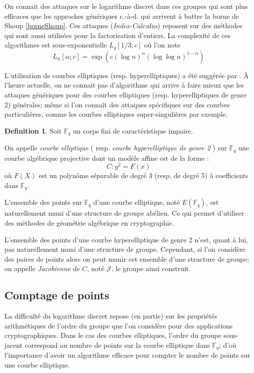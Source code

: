 \documentclass[a4paper]{article}
\theoremstyle{definition}
\newtheorem{definition}{Definition}[section]
\theoremstyle{remark}
\numberwithin{equation}{section}
\begin{document}
On connait des attaques sur le logarithme discret dans ces groupes qui sont plus efficaces que les approches génériques c.-à-d. qui arrivent à battre la borne de Shoup \ref{borneShoup}. Ces attaques (\emph{Index-Calculus}) reposent sur des méthodes qui sont aussi utilisées pour la factorisation d'entiers. La complexité de ces algorithmes est sous-exponentielle $L_q[1/3;c]$ où l'on note
$$L_n[\alpha;c] = \exp(c(\log n)^\alpha(\log \log n)^{1-\alpha})$$

L'utilisation de courbes elliptiques (resp. hyperelliptiques) a été suggérée par \citet{koblitz1,koblitz2}. À l'heure actuelle, on ne connait pas d'algorithme qui arrive à faire mieux que les attaques génériques pour des courbes elliptiques (resp. hyperelliptiques de genre 2) générales; même si l'on connaît des attaques spécifiques sur des courbes particulières, comme les courbes elliptiques super-singulières par exemple.

\begin{definition}
Soit $\mathbb{F}_q$ un corps fini de caractéristique impaire.

On appelle \emph{courbe elliptique} ( resp. \emph{courbe hyperelliptique de genre 2} ) sur $\mathbb{F}_q$ une courbe algébrique projective dont un modèle affine est de la forme :
$$C : y^2 = F(x)$$
où $F(X)$ est un polynôme séparable de degré 3 (resp. de degré 5) à coefficients dans $\mathbb{F}_q$.
\end{definition}

L'ensemble des points sur $\mathbb{F}_q$ d'une courbe elliptique, noté $E(\mathbb{F}_q)$, est naturellement muni d'une structure de groupe abélien. Ce qui permet d'utiliser des méthodes de géométrie algébrique en cryptographie.

L'ensemble des points d'une courbe hyperelliptique de genre 2 n'est, quant à lui, pas naturellement muni d'une structure de groupe. Cependant, si l'on considère des paires de points alors on peut munir cet ensemble d'une structure de groupe; on appelle \emph{Jacobienne} de $C$, noté $\mathcal{J}$, le groupe ainsi construit.

\subsection{Comptage de points}
La difficulté du logarithme discret repose (en partie) sur les propriétés arithmétiques de l'ordre du groupe que l'on considère pour des applications cryptographiques. Dans le cas des courbes elliptiques, l'ordre du groupe sous-jacent correspond au nombre de points sur la courbe elliptique dans $\mathbb{F}_q$; d'où l'importance d'avoir un algorithme efficace pour compter le nombre de points sur une courbe elliptique.
\end{document}
